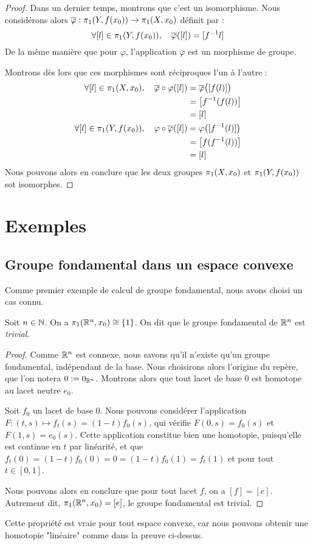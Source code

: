 \documentclass[hidelinks, 10pt]{article}
\begin{document}
\begin{proof}
\bigskip Dans un dernier temps, montrons que c'est un isomorphisme. Nous considérons alors $\overline{\varphi}:\pi_1(Y,f(x_0))\rightarrow\pi_1(X,x_0)$ définit par : \[\forall[l]\in\pi_1(Y,f(x_0)),\quad \overline{\varphi}([l])=[f^{-1}l]\]De la même manière que pour $\varphi$, l'application $\overline{\varphi}$ est un morphisme de groupe.

Montrons dès lors que ces morphismes sont réciproques l'un à l'autre : \[\begin{split}
    \forall[l]\in\pi_1(X,x_0),\quad \overline{\varphi}\circ\varphi([l])&=\overline{\varphi}\big([f(l)]\big)\\
    &=\big[f^{-1}(f(l))\big]\\
    &=[l]\\
    \forall[l]\in\pi_1(Y,f(x_0)),\quad\varphi\circ\overline{\varphi}([l])&=\varphi\big([f^{-1}(l)]\big)\\
    &=\big[f(f^{-1}(l))\big]\\
    &=[l]
\end{split}\]Nous pouvons alors en conclure que les deux groupes $\pi_1(X,x_0)$ et $\pi_1(Y,f(x_0))$ sot isomorphes.
\end{proof}

\section{Exemples}
\subsection{Groupe fondamental dans un espace convexe}
Comme premier exemple de calcul de groupe fondamental, nous avons choisi un cas connu.

\begin{proposition}
Soit $n\in\mathbb{N}$. On a $\pi_1(\mathbb{R}^n,x_0)\cong\{1\}$. On dit que le groupe fondamental de $\mathbb{R}^n$ est \emph{trivial}.
\end{proposition}
\begin{proof}
Comme $\mathbb{R}^n$ est connexe, nous savons qu'il n'existe qu'un groupe fondamental, indépendant de la base. Nous choisirons alors l'origine du repère, que l'on notera $0:=0_{\mathbb{R}^n}$. Montrons alors que tout lacet de base $0$ est homotope au lacet neutre $e_0$.

Soit $f_0$ un lacet de base $0$. Nous pouvons considérer l'application $F:(t,s)\mapsto f_t(s)=(1-t)f_0(s)$, qui vérifie $F(0,s)=f_0(s)$ et $F(1,s)=e_0(s)$. Cette application constitue bien une homotopie, puisqu'elle est continue en $t$ par linéarité, et que $f_t(0)=(1-t)f_0(0)=0=(1-t)f_0(1)=f_t(1)$ et pour tout $t\in[0,1]$.

\bigskip Nous pouvons alors en conclure que pour tout lacet $f$, on a $[f]=[e]$. Autrement dit, $\pi_1(\mathbb{R}^n,x_0)=[e]$, le groupe fondamental est trivial.
\end{proof}
\begin{remark}
Cette propriété est vraie pour tout espace convexe, car nous pouvons obtenir une homotopie "linéaire" comme dans la preuve ci-dessus.
\end{remark}
\end{document}

